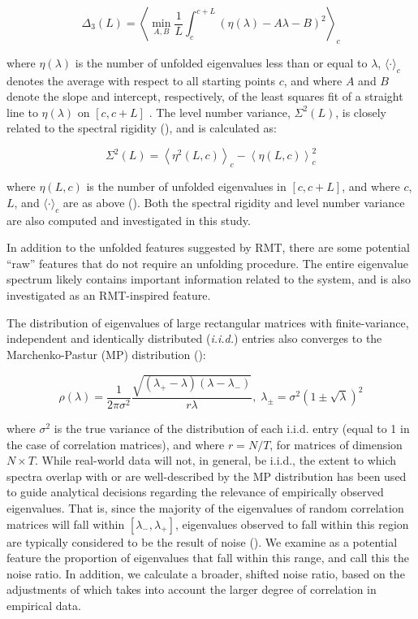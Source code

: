 \[
\Delta_3(L) = \left \langle \min_{A,B} \frac{1}{L} \int_c^{c+L} \left(  \eta(\lambda) -A \lambda - B \right)^2 \right \rangle_c
\]

where \(\eta(\lambda)\) is the number of unfolded eigenvalues less than or equal to \(\lambda\),
\(\langle \cdot \rangle_c\) denotes the average with respect to all starting points \(c\), and where
\(A\) and \(B\) denote the slope and intercept, respectively, of the least squares fit of a straight
line to \(\eta(\lambda)\) on \([c, c+L]\) \cite{guhrRandommatrixTheoriesQuantum1998a}. The level
number variance, \(\Sigma^2(L)\), is closely related to the spectral rigidity
(\cite{mehtaRandomMatrices2004}), and is calculated as:

\[
\Sigma^2(L) = \left\langle \eta^2(L, c) \right\rangle_c - \left\langle \eta(L, c) \right\rangle^2_c
\]

where \(\eta(L, c)\) is the number of unfolded eigenvalues in \([c, c+ L]\), and where \(c\), \(L\),
and \(\langle \cdot \rangle_c\) are as above (\cite{guhrRandommatrixTheoriesQuantum1998a}). Both the
spectral rigidity and level number variance are also computed and investigated in this study.

In addition to the unfolded features suggested by RMT, there are some potential ``raw'' features that
do not require an unfolding procedure. The entire eigenvalue spectrum likely contains important
information related to the system, and is also investigated as an RMT-inspired feature.

The distribution of eigenvalues of large rectangular matrices with finite-variance, independent and
identically distributed (\textit{i.i.d.}) entries also converges to the Marchenko-Pastur (MP)
distribution (\cite{marcenkoDISTRIBUTIONEIGENVALUESSETS1967,yaoLargeSampleCovariance2015}):

\[
\rho(\lambda) =
\frac{1}{2\pi\sigma^2}
\frac{\sqrt{(\lambda_+ - \lambda)(\lambda - \lambda_-)}}{r\lambda}, \;
\lambda_{\pm} = \sigma^2\left(1 \pm \sqrt{\lambda}\right)^2
\]

where \(\sigma^2\) is the true variance of the distribution of each i.i.d. entry (equal to 1 in the
case of correlation matrices), and where \(r = N / T\), for matrices of dimension \(N \times T\).
While real-world data will not, in general, be i.i.d., the extent to which spectra overlap with or
are well-described by the MP distribution has been used to guide analytical decisions regarding the
relevance of empirically observed eigenvalues. That is, since the majority of the eigenvalues of
random correlation matrices will fall within \([\lambda_{-}, \lambda_{+}]\), eigenvalues observed to
fall within this region are typically considered to be the result of noise
(\cite{veraartDenoisingDiffusionMRI2016,veraartDiffusionMRINoise2016,ulfarssonDimensionEstimationNoisy2008,macmahonCommunityDetectionCorrelation2015}).
We examine as a potential feature the proportion of eigenvalues that fall within this range, and
call this the noise ratio. In addition, we calculate a broader, shifted noise ratio, based on the
adjustments of \cite{almogUncoveringFunctionalSignature2019} which takes into account the larger
degree of correlation in empirical data.

